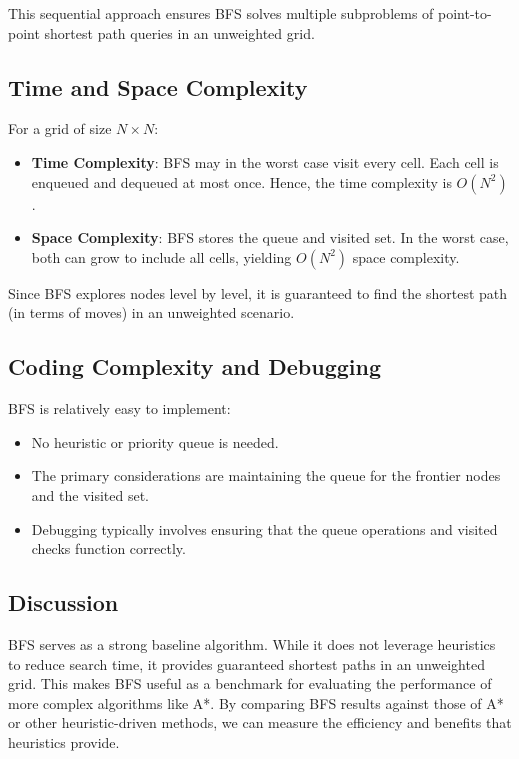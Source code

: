 \documentclass[12pt]{article}
\begin{document}
\noindent This sequential approach ensures BFS solves multiple subproblems of point-to-point shortest path queries in an unweighted grid.

\subsection{Time and Space Complexity}
For a grid of size \( N \times N \):
\begin{itemize}
    \item \textbf{Time Complexity}: BFS may in the worst case visit every cell. Each cell is enqueued and dequeued at most once. Hence, the time complexity is \( O(N^2) \).
    \item \textbf{Space Complexity}: BFS stores the queue and visited set. In the worst case, both can grow to include all cells, yielding \( O(N^2) \) space complexity.
\end{itemize}

\noindent Since BFS explores nodes level by level, it is guaranteed to find the shortest path (in terms of moves) in an unweighted scenario.

\subsection{Coding Complexity and Debugging}
BFS is relatively easy to implement:
\begin{itemize}
    \item No heuristic or priority queue is needed.
    \item The primary considerations are maintaining the queue for the frontier nodes and the visited set.
    \item Debugging typically involves ensuring that the queue operations and visited checks function correctly.
\end{itemize}

\subsection{Discussion}
BFS serves as a strong baseline algorithm. While it does not leverage heuristics to reduce search time, it provides guaranteed shortest paths in an unweighted grid. This makes BFS useful as a benchmark for evaluating the performance of more complex algorithms like A*. By comparing BFS results against those of A* or other heuristic-driven methods, we can measure the efficiency and benefits that heuristics provide.
\newpage
\end{document}
